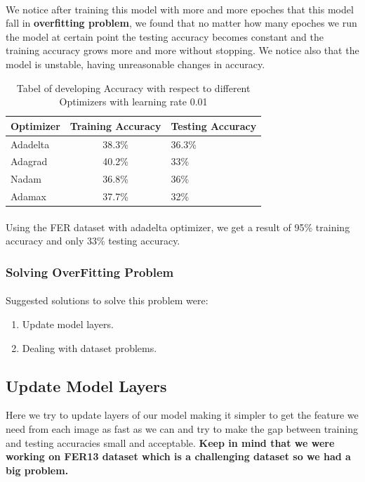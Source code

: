 \paragraph{}
We notice after training this model with more and more epoches that this model fall in \textbf{overfitting problem}, we found that no matter how many epoches we run the model at certain point the testing accuracy becomes constant and the training accuracy grows more and more without stopping. We notice also that the model is unstable, having unreasonable changes in accuracy. 
\begin{table}[h!]
	\begin{center}
		\caption{Tabel of developing Accuracy with respect to different Optimizers with learning rate 0.01 \newline}
		\label{tab:optimizers}
		\begin{tabular}{l|c|l}
			\textbf{Optimizer} & \textbf{Training Accuracy} & \textbf{Testing Accuracy}\\ 
			\hline 
			Adadelta & 38.3\% & 36.3\% \\
			Adagrad & 40.2\% & 33\%\\
			Nadam & 36.8\% & 36\% \\
			Adamax & 37.7\% & 32\% \\
		\end{tabular}
	\end{center}
\end{table}
\paragraph{}
Using the FER dataset with adadelta optimizer, we get a result of 95\% training accuracy and only 33\% testing accuracy.
\subsubsection{Solving OverFitting Problem}
\paragraph{} Suggested solutions to solve this problem were:
\begin{enumerate}
	\item Update model layers.
	\item Dealing with dataset problems.
\end{enumerate}
\subsection{Update Model Layers}
Here we try to update layers of our model making it simpler to get the feature we need from each image as fast as we can and try to make the gap between training and testing accuracies small and acceptable.
\textbf{Keep in mind that we were working on FER13 dataset which is a challenging dataset so we had a big problem.}
